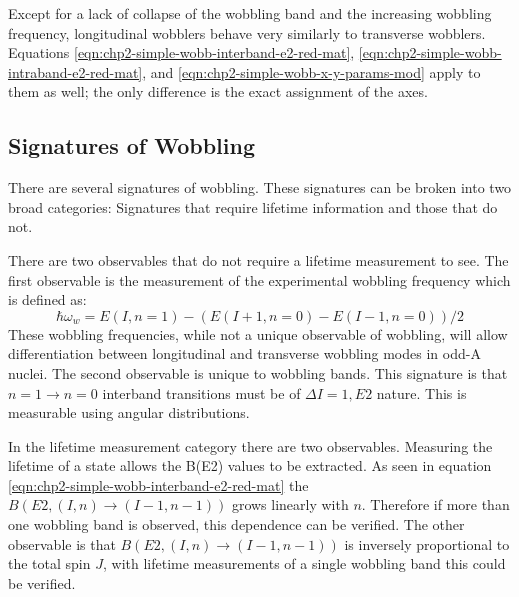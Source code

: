 Except for a lack of collapse of the wobbling band and the increasing wobbling frequency, longitudinal wobblers behave very similarly to transverse wobblers. Equations \ref{eqn:chp2-simple-wobb-interband-e2-red-mat}, \ref{eqn:chp2-simple-wobb-intraband-e2-red-mat}, and \ref{eqn:chp2-simple-wobb-x-y-params-mod} apply to them as well; the only difference is the exact assignment of the axes.

\subsection{Signatures of Wobbling}
\label{ssec:models-wobbling-signatures}
There are several signatures of wobbling. These signatures can be broken into two broad categories: Signatures that require lifetime information and those that do not.

There are two observables that do not require a lifetime measurement to see. The first observable is the measurement of the experimental wobbling frequency which is defined as:
\begin{equation}
\label{eqn:chp2-exp-wob-frequencies}
\hbar\omega_w = E(I,n=1) - (E(I+1,n=0)-E(I-1,n=0))/2
\end{equation}
 These wobbling frequencies, while not a unique observable of wobbling, will allow differentiation between longitudinal and transverse wobbling modes in odd-A nuclei. The second observable is unique to wobbling bands. This signature is that $n=1 \rightarrow n=0$ interband transitions must be of $\Delta{}I=1, E2$ nature. This is measurable using angular distributions.
 
In the lifetime measurement category there are two observables. Measuring the lifetime of a state allows the B(E2) values to be extracted. As seen in equation \ref{eqn:chp2-simple-wobb-interband-e2-red-mat} the $B(E2,(I,n)\rightarrow(I-1,n-1))$ grows linearly with $n$. Therefore if more than one wobbling band is observed, this dependence can be verified. The other observable is that $B(E2,(I,n)\rightarrow(I-1,n-1))$ is inversely proportional to the total spin $J$, with lifetime measurements of a single wobbling band this could be verified.